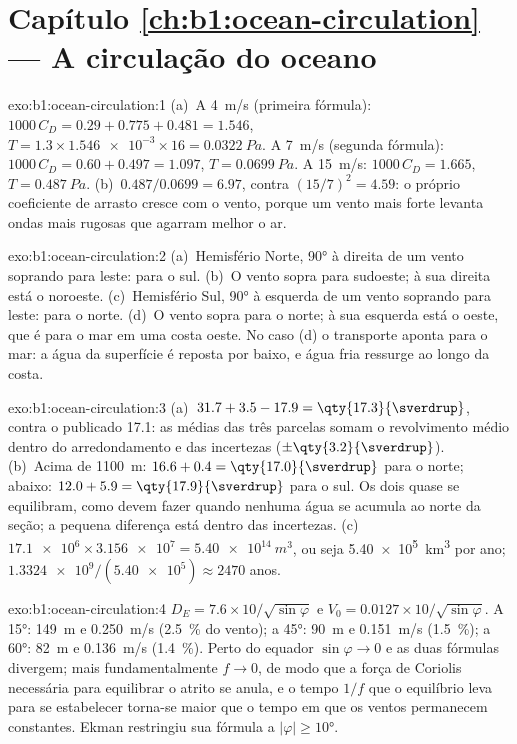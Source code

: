 \section*{Capítulo \ref{ch:b1:ocean-circulation} --- A circulação do oceano}

\begin{solution}{exo:b1:ocean-circulation:1}
(a)~A \qty{4}{m/s} (primeira fórmula): $1000\,C_D = 0.29 + 0.775 + 0.481 = 1.546$,
$T = 1.3 \times \num{1.546e-3} \times 16 = \qty{0.0322}{Pa}$. A \qty{7}{m/s}
(segunda fórmula): $1000\,C_D = 0.60 + 0.497 = 1.097$, $T = \qty{0.0699}{Pa}$. A
\qty{15}{m/s}: $1000\,C_D = 1.665$, $T = \qty{0.487}{Pa}$. (b)~$0.487/0.0699 =
6.97$, contra $(15/7)^2 = 4.59$: o próprio coeficiente de arrasto cresce com o vento,
porque um vento mais forte levanta ondas mais rugosas que agarram melhor o ar.
\end{solution}

\begin{solution}{exo:b1:ocean-circulation:2}
(a)~Hemisfério Norte, \ang{90} à direita de um vento soprando para leste: para o
sul. (b)~O vento sopra para sudoeste; à sua direita está o noroeste.
(c)~Hemisfério Sul, \ang{90} à esquerda de um vento soprando para leste: para o
norte. (d)~O vento sopra para o norte; à sua esquerda está o oeste, que é para o mar
em uma costa oeste. No caso (d) o transporte aponta para o mar: a água da superfície é
reposta por baixo, e água fria ressurge ao longo da costa.
\end{solution}

\begin{solution}{exo:b1:ocean-circulation:3}
(a)~$31.7 + 3.5 - 17.9 = \qty{17.3}{\sverdrup}$, contra o publicado
\qty{17.1}{\sverdrup}: as médias das três parcelas somam o revolvimento médio dentro
do arredondamento e das incertezas ($\pm\qty{3.2}{\sverdrup}$).
(b)~Acima de \qty{1100}{m}: $16.6 + 0.4 = \qty{17.0}{\sverdrup}$ para o norte; abaixo:
$12.0 + 5.9 = \qty{17.9}{\sverdrup}$ para o sul. Os dois quase se equilibram, como devem
fazer quando nenhuma água se acumula ao norte da seção; a pequena diferença está dentro das
incertezas. (c)~$\num{17.1e6} \times \num{3.156e7} = \qty{5.40e14}{m^3}$, ou seja
\qty{5.40e5}{km^3} por ano; $\num{1.3324e9}/(\num{5.40e5}) \approx 2470$ anos.
\end{solution}

\begin{solution}{exo:b1:ocean-circulation:4}
$D_E = 7.6 \times 10/\sqrt{\sin\varphi}$ e $V_0 = 0.0127 \times
10/\sqrt{\sin\varphi}$. A \ang{15}: \qty{149}{m} e \qty{0.250}{m/s}
(\qty{2.5}{\percent} do vento); a \ang{45}: \qty{90}{m} e \qty{0.151}{m/s}
(\qty{1.5}{\percent}); a \ang{60}: \qty{82}{m} e \qty{0.136}{m/s}
(\qty{1.4}{\percent}). Perto do equador $\sin\varphi \to 0$ e as duas fórmulas
divergem; mais fundamentalmente $f \to 0$, de modo que a força de Coriolis necessária para equilibrar
o atrito se anula, e o tempo $1/f$ que o equilíbrio leva para se estabelecer torna-se maior
que o tempo em que os ventos permanecem constantes. Ekman restringiu sua fórmula a $|\varphi| \geq
\ang{10}$.
\end{solution}

